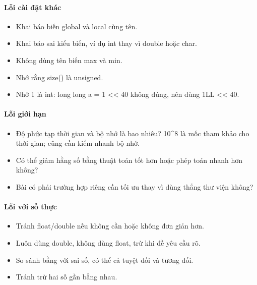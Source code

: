 \documentclass[11pt]{article}
\begin{document}
\paragraph{Lỗi cài đặt khác}\begin{itemize}

\item Khai báo biến global và local cùng tên.

\item Khai báo sai kiểu biến, ví dụ int thay vì double hoặc char.

\item Không dùng tên biến max và min.

\item Nhớ rằng size() là unsigned.

\item Nhớ 1 là int: long long a = 1 << 40 không đúng, nên dùng 1LL << 40.

\end{itemize}

\paragraph{Lỗi giới hạn}\begin{itemize}

\item Độ phức tạp thời gian và bộ nhớ là bao nhiêu? 10\textasciicircum{}8 là mốc tham khảo cho thời gian; cũng cần kiểm nhanh bộ nhớ.

\item Có thể giảm hằng số bằng thuật toán tốt hơn hoặc phép toán nhanh hơn không?

\item Bài có phải trường hợp riêng cần tối ưu thay vì dùng thẳng thư viện không?

\end{itemize}

\paragraph{Lỗi với số thực}\begin{itemize}

\item Tránh float/double nếu không cần hoặc không đơn giản hơn.

\item Luôn dùng double, không dùng float, trừ khi đề yêu cầu rõ.

\item So sánh bằng với sai số, có thể cả tuyệt đối và tương đối.

\item Tránh trừ hai số gần bằng nhau.

\end{itemize}
\end{document}
